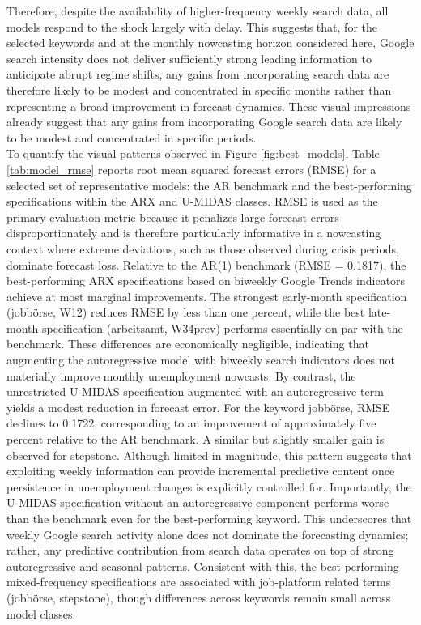 \documentclass[12pt,a4paper]{article}
\begin{document}
Therefore, despite the availability of higher-frequency weekly search data, all models respond to the shock largely with delay. This suggests that, for the selected keywords and at the monthly nowcasting horizon considered here, Google search intensity does not deliver sufficiently strong leading information to anticipate abrupt regime shifts, any gains from incorporating search data are therefore likely to be modest and concentrated in specific months rather than representing a broad improvement in forecast dynamics.
These visual impressions already suggest that any gains from incorporating Google search data are likely to be modest and concentrated in specific periods. \\
To quantify the visual patterns observed in Figure \ref{fig:best_models}, Table \ref{tab:model_rmse} reports root mean squared forecast errors (RMSE) for a selected set of representative models: the AR benchmark and the best-performing specifications within the ARX and U-MIDAS classes. 
RMSE is used as the primary evaluation metric because it penalizes large forecast errors disproportionately and is therefore particularly informative in a nowcasting context where extreme deviations, such as those observed during crisis periods, dominate forecast loss.
Relative to the AR(1) benchmark (RMSE = 0.1817), the best-performing ARX specifications based on biweekly Google Trends indicators achieve at most marginal improvements. The strongest early-month specification (jobbörse, W12) reduces RMSE by less than one percent, while the best late-month specification (arbeitsamt, W34prev) performs essentially on par with the benchmark. These differences are economically negligible, indicating that augmenting the autoregressive model with biweekly search indicators does not materially improve monthly unemployment nowcasts.
By contrast, the unrestricted U-MIDAS specification augmented with an autoregressive term yields a modest reduction in forecast error. For the keyword jobbörse, RMSE declines to 0.1722, corresponding to an improvement of approximately five percent relative to the AR benchmark. A similar but slightly smaller gain is observed for stepstone. Although limited in magnitude, this pattern suggests that exploiting weekly information can provide incremental predictive content once persistence in unemployment changes is explicitly controlled for.
Importantly, the U-MIDAS specification without an autoregressive component performs worse than the benchmark even for the best-performing keyword. This underscores that weekly Google search activity alone does not dominate the forecasting dynamics; rather, any predictive contribution from search data operates on top of strong autoregressive and seasonal patterns. Consistent with this, the best-performing mixed-frequency specifications are associated with job-platform related terms (jobbörse, stepstone), though differences across keywords remain small across model classes.
\end{document}
